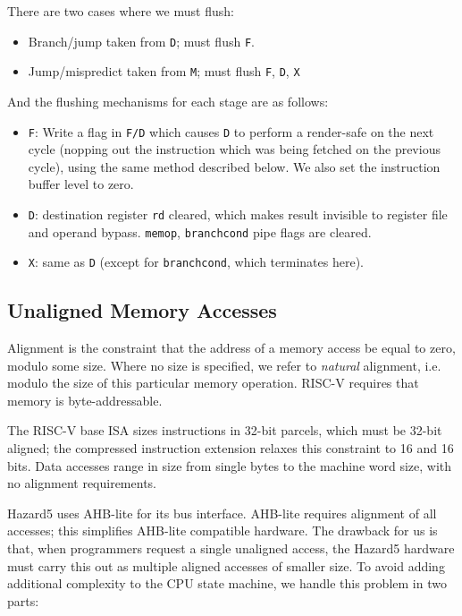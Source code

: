 \documentclass{article}
\begin{document}
There are two cases where we must flush:

\begin{itemize}
	\item Branch/jump taken from \texttt{D}; must flush \texttt{F}.
	\item Jump/mispredict taken from \texttt{M}; must flush \texttt{F}, \texttt{D}, \texttt{X}
\end{itemize}

And the flushing mechanisms for each stage are as follows:
\begin{itemize}
	\item \texttt{F}: Write a flag in \texttt{F/D} which causes \texttt{D} to perform a render-safe on the next cycle (nopping out the instruction which was being fetched on the previous cycle), using the same method described below. We also set the instruction buffer level to zero.
	\item \texttt{D}: destination register \texttt{rd} cleared, which makes result invisible to register file and operand bypass. \texttt{memop}, \texttt{branchcond} pipe flags are cleared.
	\item \texttt{X}: same as \texttt{D} (except for \texttt{branchcond}, which terminates here).
\end{itemize}

\subsection{Unaligned Memory Accesses}

Alignment is the constraint that the address of a memory access be equal to zero, modulo some size. Where no size is specified, we refer to \textit{natural} alignment, i.e. modulo the size of this particular memory operation. RISC-V requires that memory is byte-addressable.

The RISC-V base ISA sizes instructions in 32-bit parcels, which must be 32-bit aligned; the compressed instruction extension relaxes this constraint to 16 and 16 bits. Data accesses range in size from single bytes to the machine word size, with no alignment requirements.

Hazard5 uses AHB-lite for its bus interface. AHB-lite requires alignment of all accesses; this simplifies AHB-lite compatible hardware. The drawback for us is that, when programmers request a single unaligned access, the Hazard5 hardware must carry this out as multiple aligned accesses of smaller size. To avoid adding additional complexity to the CPU state machine, we handle this problem in two parts:
\end{document}

